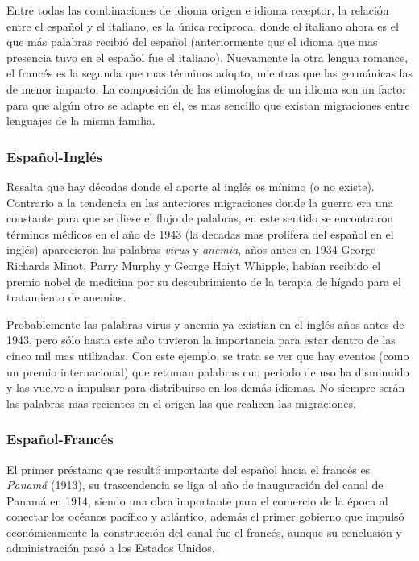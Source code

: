 \newpage

Entre todas las combinaciones de idioma origen e idioma receptor,  la relación entre el español y el italiano, es la única reciproca, donde  el italiano ahora es el que más palabras recibió del español (anteriormente que el idioma que mas presencia tuvo en el español fue el italiano).  Nuevamente la otra lengua romance, el francés es la segunda que mas términos adopto,  mientras que las germánicas las de menor impacto.  La composición de las etimologías de un idioma son un factor para que algún otro se adapte en él, es mas sencillo que existan migraciones entre lenguajes de la misma familia. 

\subsubsection*{Español-Inglés}

Resalta que hay décadas donde el aporte al inglés es mínimo (o no existe). Contrario a la tendencia en las anteriores migraciones donde la guerra era una constante para que se diese el flujo de palabras, en este sentido se encontraron términos médicos en el año de 1943 (la decadas mas prolifera del español en el inglés) aparecieron las palabras \textit{virus} y \textit{anemia}, años antes en 1934 George Richards Minot, Parry Murphy y George Hoiyt Whipple, habían recibido el premio nobel de medicina por su descubrimiento de la terapia de hígado para el tratamiento de anemias.   

Probablemente las palabras virus y anemia ya existían en el inglés años antes de 1943,  pero sólo hasta este año tuvieron la importancia para estar dentro de las cinco mil mas utilizadas. Con este ejemplo, se trata se ver que hay eventos (como un premio internacional) que retoman palabras cuo periodo de uso  ha disminuido y las vuelve a impulsar para distribuirse en los demás idiomas.   No siempre serán las palabras mas recientes en el origen las que realicen las migraciones. 

\subsubsection*{Español-Francés}

El primer préstamo que resultó importante del español hacia el francés es \textit{Panamá} (1913), su trascendencia se liga al año de inauguración del canal de Panamá en 1914, siendo una obra importante para el comercio de la época al conectar los océanos pacífico y atlántico, además el primer gobierno que impulsó económicamente la construcción del canal fue el francés,  aunque su conclusión y administración pasó a los Estados Unidos.  




